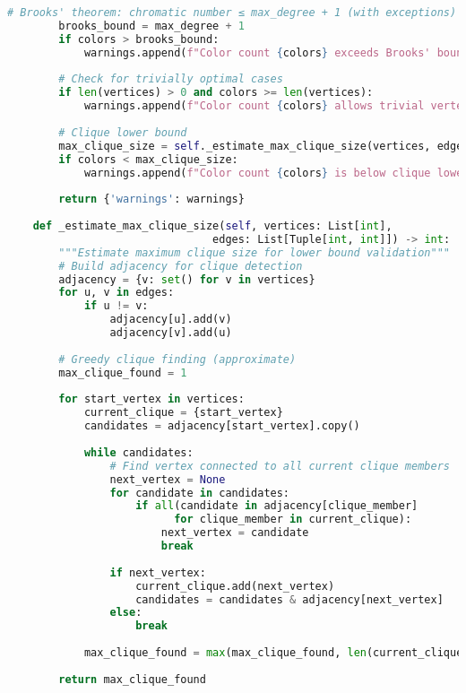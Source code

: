 \begin{lstlisting}[language=Python, caption=Test Case Validation and Verification]
        # Brooks' theorem: chromatic number ≤ max_degree + 1 (with exceptions)
        brooks_bound = max_degree + 1
        if colors > brooks_bound:
            warnings.append(f"Color count {colors} exceeds Brooks' bound {brooks_bound}")
        
        # Check for trivially optimal cases
        if len(vertices) > 0 and colors >= len(vertices):
            warnings.append(f"Color count {colors} allows trivial vertex-color assignment")
        
        # Clique lower bound
        max_clique_size = self._estimate_max_clique_size(vertices, edges)
        if colors < max_clique_size:
            warnings.append(f"Color count {colors} is below clique lower bound {max_clique_size}")
        
        return {'warnings': warnings}
    
    def _estimate_max_clique_size(self, vertices: List[int], 
                                edges: List[Tuple[int, int]]) -> int:
        """Estimate maximum clique size for lower bound validation"""
        # Build adjacency for clique detection
        adjacency = {v: set() for v in vertices}
        for u, v in edges:
            if u != v:
                adjacency[u].add(v)
                adjacency[v].add(u)
        
        # Greedy clique finding (approximate)
        max_clique_found = 1
        
        for start_vertex in vertices:
            current_clique = {start_vertex}
            candidates = adjacency[start_vertex].copy()
            
            while candidates:
                # Find vertex connected to all current clique members
                next_vertex = None
                for candidate in candidates:
                    if all(candidate in adjacency[clique_member] 
                          for clique_member in current_clique):
                        next_vertex = candidate
                        break
                
                if next_vertex:
                    current_clique.add(next_vertex)
                    candidates = candidates & adjacency[next_vertex]
                else:
                    break
            
            max_clique_found = max(max_clique_found, len(current_clique))
        
        return max_clique_found
\end{lstlisting}

